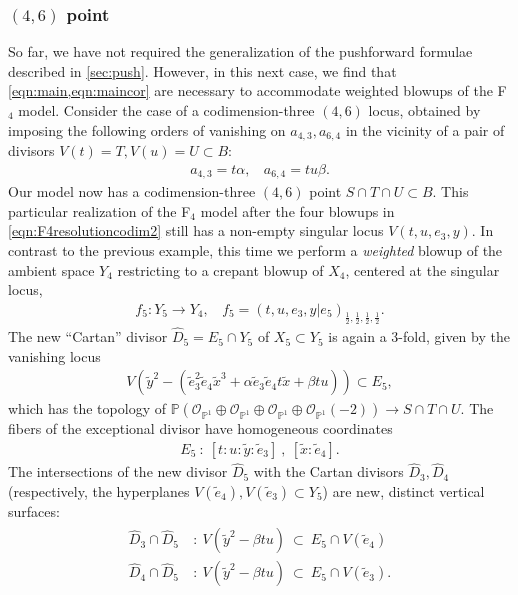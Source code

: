 \documentclass[11pt,oneside,english]{article}
\numberwithin{equation}{section}
\theoremstyle{definition}
\begin{document}
\subsubsection{$(4,6)$ point}
So far, we have not required the generalization of the pushforward formulae described in \cref{sec:push}. However, in this next case, we find that \cref{eqn:main,eqn:maincor} are necessary to accommodate weighted blowups of the F$_4$ model. Consider the case of a codimension-three $(4,6)$ locus, obtained by imposing the following orders of vanishing on $a_{4,3}, a_{6,4}$ in the vicinity of a pair of divisors $V(t) =T, V(u) = U \subset B$:
	\begin{align}
		a_{4,3} = t \alpha , ~~~~ a_{6,4} = t u \beta.
	\end{align}
Our model now has a codimension-three $(4,6)$ point $S\cap T \cap U \subset B$. This particular realization of the F$_4$ model after the four blowups in \cref{eqn:F4resolutioncodim2} still has a non-empty singular locus $V( t ,u ,e_3, y )$. In contrast to the previous example, this time we perform a \emph{weighted} blowup of the ambient space $Y_4$ restricting to a crepant blowup of $X_4$, centered at the singular locus,
	\begin{align}
	\label{eqn:fifthF4codim3}
		f_5 : Y_5 \rightarrow Y_4, ~~~~f_5 = (t,u,e_3,y|e_5)_{\frac{1}{2},\frac{1}{2},\frac{1}{2}, \frac{1}{2}}.
	\end{align}
The new ``Cartan'' divisor $\hat D_5 = {E}_5 \cap  Y_5$ of $X_5 \subset Y_5$ is again a 3-fold, given by the vanishing locus
	\begin{align}
	V(	\tilde y^2 - ( \tilde e_3^2 \tilde e_4 \tilde x^3 + \alpha \tilde e_3 \tilde e_4 t \tilde x + \beta t u) ) \subset E_5,
	\end{align}
 which has the topology of $\mathbb P( \mathcal O_{\mathbb P^1} \oplus \mathcal O_{\mathbb P^1}  \oplus \mathcal O_{\mathbb P^1}  \oplus \mathcal O_{\mathbb P^1} (-2) )  \rightarrow S\cap T\cap U$. The fibers of the exceptional divisor have homogeneous coordinates
	\begin{align}
		{E}_5~:~[ t:u:\tilde y: \tilde e_3]~,~ [ \tilde x: \tilde e_4]. 	
	\end{align}
The intersections of the new divisor $\hat D_5$ with the Cartan divisors $\hat D_3, \hat D_4$ (respectively, the hyperplanes $V(\tilde e_4 ), V(\tilde e_3) \subset Y_5$) are new, distinct vertical surfaces:
	\begin{align}
		\begin{split}
			\hat D_3 \cap \hat D_5 ~&:~ V(\tilde y^2 - \beta tu )~ \subset~ {E}_5 \cap {V(\tilde e_4)}\\
			\hat D_4 \cap \hat D_5~&:~ V(\tilde y^2 - \beta t u)~ \subset ~ {E}_5 \cap {V(\tilde e_3)}.
		\end{split}	
	\end{align}
\end{document}
